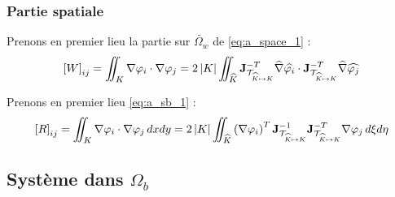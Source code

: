 \subsubsection{Partie spatiale}
\noindent Prenons en premier lieu la partie sur $\widetilde{\Omega_w}$ de \eqref{eq:a_space_1} :
\begin{equation}
	\left[W\right]_{ij} = \iint_{K} \nabla \varphi_i\cdot\nabla \varphi_j= 2\left|K\right| \iint_{\widehat{K}}  \mathbf{J}_{\mathcal{T}_{\widehat{K}\mapsto K}}^{-T}\widehat{\nabla} \widehat{\varphi_i} \cdot \mathbf{J}_{\mathcal{T}_{\widehat{K}\mapsto K}}^{-T} \widehat{\nabla} \widehat{\varphi_j}
\end{equation}

\noindent Prenons en premier lieu \eqref{eq:a_sb_1} :
\begin{equation}
\left[R\right]_{ij} = \iint_{K} \nabla \varphi_i\cdot\nabla \varphi_j \,dxdy = 2\left|K\right| \iint_{\widehat{K}}  \left(\nabla \varphi_i\right)^{T}\mathbf{J}_{\mathcal{T}_{\widehat{K}\mapsto K}}^{-1} \mathbf{J}_{\mathcal{T}_{\widehat{K}\mapsto K}}^{-T} \nabla \varphi_j  \,d\xi d\eta
\end{equation}

\subsection{Système dans $\Omega_b$}
